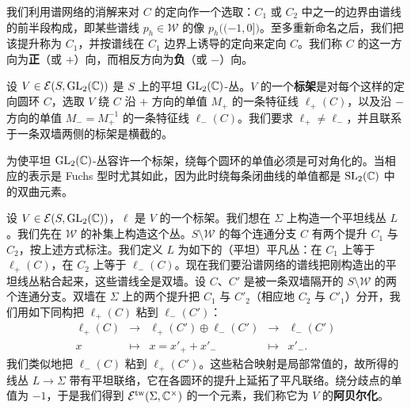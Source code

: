 我们利用谱网络的消解来对 $C$ 的定向作一个选取：$C_1$ 或 $C_2$ 中之一的边界由谱线的前半段构成，即某些谱线 $p_h\in\mathcal{W}$ 的像 $p_h\big((-1,0]\big)$。至多重新命名之后，我们把该提升称为 $C_1$，并按谱线在 $C_1$ 边界上诱导的定向来定向 $C$。我们称 $C$ 的这一方向为\textbf{正}（或 $+$）向，而相反方向为\textbf{负}（或 $-$）向。

\begin{definition}[15.7]
设 $V\in\mathcal{E}(S,\operatorname{GL}_2(\mathbb{C}))$ 是 $S$ 上的平坦 $\operatorname{GL}_2(\mathbb{C})$-丛。$V$ 的一个\textbf{标架}是对每个这样的定向圆环 $C$，选取 $V$ 绕 $C$ 沿 $+$ 方向的单值 $M_+$ 的一条特征线 $\ell_+(C)$，以及沿 $-$ 方向的单值 $M_-=M_+^{-1}$ 的一条特征线 $\ell_-(C)$。我们要求 $\ell_+\neq\ell_-$，并且联系于一条双墙两侧的标架是横截的。
\end{definition}

\begin{remark}[15.8]
为使平坦 $\operatorname{GL}_2(\mathbb{C})$-丛容许一个标架，绕每个圆环的单值必须是可对角化的。当相应的表示是 Fuchs 型时尤其如此，因为此时绕每条闭曲线的单值都是 $\operatorname{SL}_2(\mathbb{C})$ 中的双曲元素。
\end{remark}

设 $V\in\mathcal{E}(S,\operatorname{GL}_2(\mathbb{C}))$，$\ell$ 是 $V$ 的一个标架。我们想在 $\Sigma$ 上构造一个平坦线丛 $L$。我们先在 $\mathcal{W}$ 的补集上构造这个丛。$S\setminus\mathcal{W}$ 的每个连通分支 $C$ 有两个提升 $C_1$ 与 $C_2$，按上述方式标注。我们定义 $L$ 为如下的（平坦）平凡丛：在 $C_1$ 上等于 $\ell_+(C)$，在 $C_2$ 上等于 $\ell_-(C)$。现在我们要沿谱网络的谱线把刚构造出的平坦线丛粘合起来，这些谱线全是双墙。设 $C$、$C'$ 是被一条双墙隔开的 $S\setminus\mathcal{W}$ 的两个连通分支。双墙在 $\Sigma$ 上的两个提升把 $C_1$ 与 $C'_2$（相应地 $C_2$ 与 $C'_1$）分开，我们用如下同构把 $\ell_+(C)$ 粘到 $\ell_-(C')$：
\[
\begin{array}{ccccc}
\ell_+(C) & \to & \ell_+(C')\oplus\ell_-(C') & \to & \ell_-(C')\\[2pt]
x & \mapsto & x=x'_+ + x'_- & \mapsto & x'_- .
\end{array}
\]
我们类似地把 $\ell_-(C)$ 粘到 $\ell_+(C')$。这些粘合映射是局部常值的，故所得的线丛 $L\to\Sigma$ 带有平坦联络，它在各圆环的提升上延拓了平凡联络。绕分歧点的单值为 $-1$，于是我们得到 $\mathcal{E}^{\mathrm{tw}}(\Sigma,\mathbb{C}^\times)$ 的一个元素，我们称它为 $V$ 的\textbf{阿贝尔化}。

